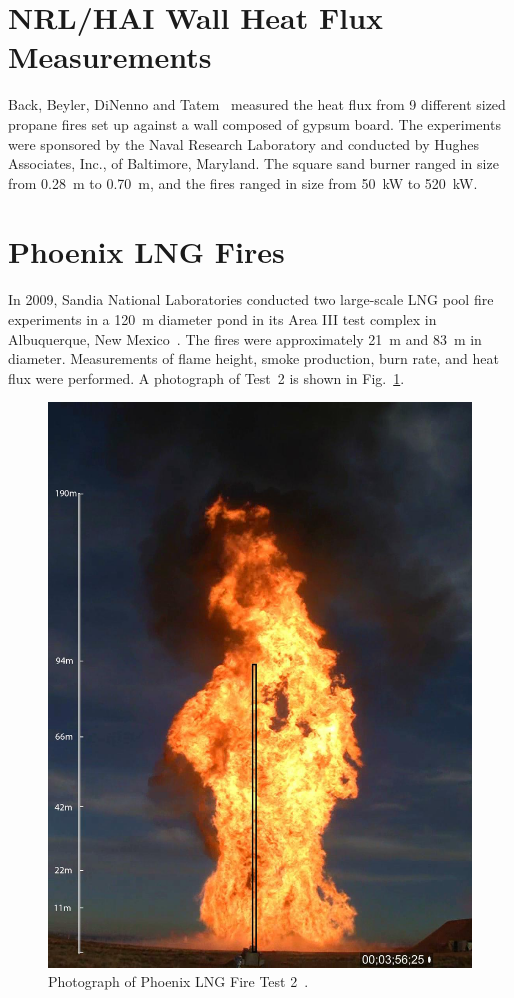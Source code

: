 \section{NRL/HAI Wall Heat Flux Measurements}
\label{NRL_HAI_Description}

Back, Beyler, DiNenno and Tatem~\cite{Back:IAFSS4} measured the heat flux from 9 different sized propane fires set up against a wall composed
of gypsum board. The experiments were sponsored by the Naval Research Laboratory and conducted by Hughes Associates, Inc., of Baltimore, Maryland. The
square sand burner ranged in size from 0.28~m to 0.70~m, and the fires ranged in size from 50~kW to 520~kW.


\section{Phoenix LNG Fires}
\label{Phoenix_LNG_Fires_Description}

In 2009, Sandia National Laboratories conducted two large-scale LNG pool fire experiments in a 120~m diameter pond in its Area III test complex in Albuquerque, New Mexico~\cite{Blanchat:2011}. The fires were approximately 21~m and 83~m in diameter. Measurements of flame height, smoke production, burn rate, and heat flux were performed. A photograph of Test~2 is shown in Fig.~\ref{Phoenix_Photo}.

\begin{figure}[p]
\includegraphics[width=\textwidth]{FIGURES/Phoenix_LNG_Fires/Phoenix02_photo}
\caption[Photograph of Phoenix LNG Fire Test 2]{Photograph of Phoenix LNG Fire Test 2~\cite{Blanchat:2011}.}
\label{Phoenix_Photo}
\end{figure}


